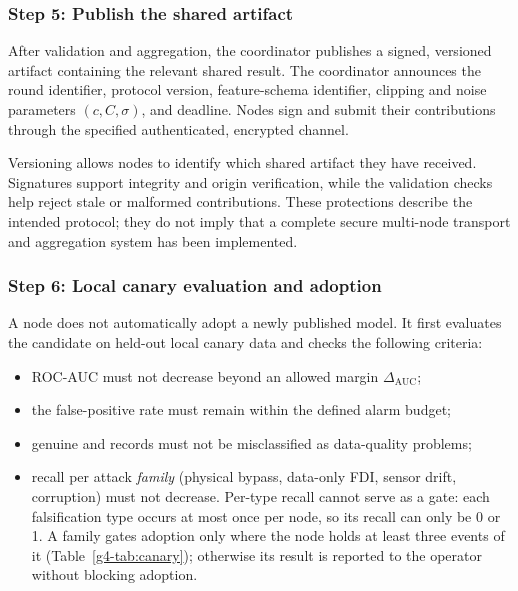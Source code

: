 \subsubsection{Step 5: Publish the shared artifact}

After validation and aggregation, the coordinator publishes a signed,
versioned artifact containing the relevant shared result. The
coordinator announces the round identifier, protocol version,
feature-schema identifier, clipping and noise parameters $(c,C,\sigma)$,
and deadline. Nodes sign and submit their contributions through the
specified authenticated, encrypted channel.

Versioning allows nodes to identify which shared artifact they have
received. Signatures support integrity and origin verification, while
the validation checks help reject stale or malformed contributions.
These protections describe the intended protocol; they do not imply
that a complete secure multi-node transport and aggregation system
has been implemented.

\subsubsection{Step 6: Local canary evaluation and adoption}

A node does not automatically adopt a newly published model. It first
evaluates the candidate on held-out local canary data and checks the
following criteria:
\begin{itemize}
    \item ROC-AUC must not decrease beyond an allowed margin
    $\Delta_{\mathrm{AUC}}$;
    \item the false-positive rate must remain within the defined alarm
    budget;
    \item genuine  and 
    records must not be misclassified as data-quality problems;
    \item recall per attack \emph{family} (physical bypass, data-only
    FDI, sensor drift, corruption) must not decrease. Per-type recall
    cannot serve as a gate: each falsification type occurs at most once
    per node, so its recall can only be 0 or 1. A family gates adoption
    only where the node holds at least three events of it
    (Table~\ref{g4-tab:canary}); otherwise its result is reported to the
    operator without blocking adoption.
\end{itemize}

